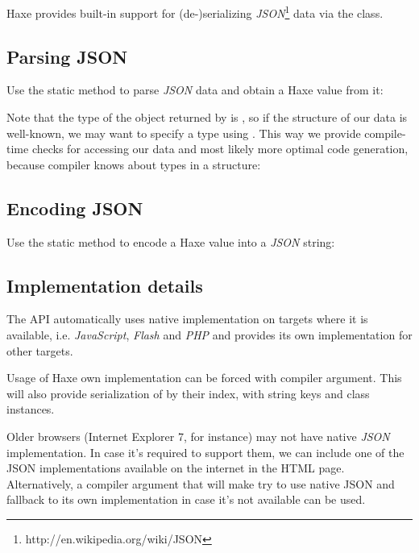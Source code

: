 Haxe provides built-in support for (de-)serializing \emph{JSON}\footnote{http://en.wikipedia.org/wiki/JSON} data via the  class.

\subsection{Parsing JSON}
\label{std-Json-parsing}

Use the  static method to parse \emph{JSON} data and obtain a Haxe value from it:

Note that the type of the object returned by  is , so if the structure of our data is well-known, we may want to specify a type using . This way we provide compile-time checks for accessing our data and most likely more optimal code generation, because compiler knows about types in a structure:

\subsection{Encoding JSON}
\label{std-Json-encoding}

Use the  static method to encode a Haxe value into a \emph{JSON} string:

\subsection{Implementation details}
\label{std-Json-implementation-details}

The  API automatically uses native implementation on targets where it is available, i.e. \emph{JavaScript}, \emph{Flash} and \emph{PHP} and provides its own implementation for other targets.

Usage of Haxe own implementation can be forced with  compiler argument. This will also provide serialization of  by their index,  with string keys and class instances.

Older browsers (Internet Explorer 7, for instance) may not have native \emph{JSON} implementation. In case it's required to support them, we can include one of the JSON implementations available on the internet in the HTML page. Alternatively, a  compiler argument that will make  try to use native JSON and fallback to its own implementation in case it's not available can be used.

